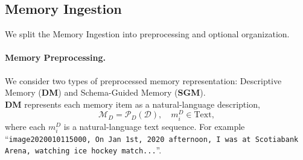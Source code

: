 \documentclass{article}
\theoremstyle{plain}
\theoremstyle{definition}
\theoremstyle{remark}
\begin{document}

\subsection{Memory Ingestion}
\label{sec:memoryIngestion}
We split the Memory Ingestion into preprocessing and optional organization.

\paragraph{Memory Preprocessing.} We consider two types of preprocessed memory representation: Descriptive Memory (\textbf{DM}) and Schema-Guided Memory (\textbf{SGM}). 
\\
\textbf{DM} represents each memory item as a natural-language description,
\begin{equation}
\mathcal{M}_D = \mathcal{P}_D(\mathcal{D}), \quad m_i^{D} \in \text{Text},
\label{eq:descriptiveMemory}
\end{equation}
where each $m_i^{D}$ is a natural-language text sequence. For example ``\texttt{image2020010115000, On Jan 1st, 2020 afternoon, I was at Scotiabank Arena, watching ice hockey match...}''.
\end{document}

